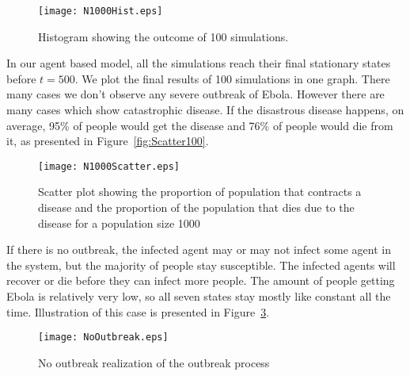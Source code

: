 \begin{figure}
\begin{center}
\texttt{[image: N1000Hist.eps]}
\end{center}
\caption{Histogram showing the outcome of 100 simulations.}
\label{fig:Hist}
\end{figure}


In our agent based model, all the simulations reach their final stationary states before $t = 500$. We plot the final results of 100 simulations in one graph. There many cases we don't observe any severe outbreak of Ebola. However there are many cases which show catastrophic disease. If the disastrous disease happens, on average, 95\% of people would get the disease and 76\% of people would die from it, as presented in Figure~\ref{fig:Scatter100}. 

 
\begin{figure}
\begin{center}
\texttt{[image: N1000Scatter.eps]}
\end{center}
\caption{Scatter plot showing the proportion of population that contracts a disease and the proportion of the population that dies due to the disease for a population size 1000}
\label{fig:Scatter}
\end{figure}


If there is no outbreak, the infected agent may or may not infect some agent in the system, but the majority of people stay susceptible. The infected agents will recover or die before they can infect more people. The amount of people getting Ebola is relatively very low, so all seven states stay mostly like constant all the time. Illustration of this case is presented in Figure~\ref{fig:NoOutbreak}.
\begin{figure}
\begin{center}
\texttt{[image: NoOutbreak.eps]}
\end{center}
\caption{No outbreak realization of the outbreak process}
\label{fig:NoOutbreak}
\end{figure}


